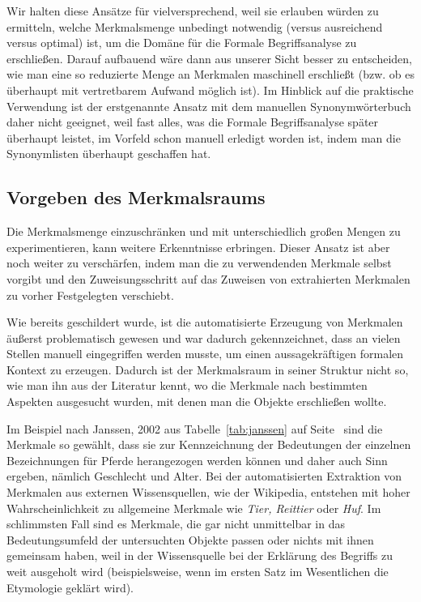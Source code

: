\documentclass[pagesize,paper=A4,DIV=calc,fontsize=12pt,draft=false]{scrreprt}
\begin{document}
Wir halten diese Ansätze für vielversprechend, weil sie erlauben würden zu ermitteln, welche Merkmalsmenge unbedingt notwendig (versus ausreichend versus optimal) ist, um die Domäne für die Formale Begriffsanalyse zu erschließen.
Darauf aufbauend wäre dann aus unserer Sicht besser zu entscheiden, wie man eine so reduzierte Menge an Merkmalen maschinell erschließt (bzw. ob es überhaupt mit vertretbarem Aufwand möglich ist).
Im Hinblick auf die praktische Verwendung ist der erstgenannte Ansatz mit dem manuellen Synonymwörterbuch daher nicht geeignet, weil fast alles, was die Formale Begriffsanalyse später überhaupt leistet, im Vorfeld schon manuell erledigt worden ist, indem man die Synonymlisten überhaupt geschaffen hat.

\subsection{Vorgeben des Merkmalsraums}

Die Merkmalsmenge einzuschränken und mit unterschiedlich großen Mengen zu experimentieren, kann weitere Erkenntnisse erbringen.
Dieser Ansatz ist aber noch weiter zu verschärfen, indem man die zu verwendenden Merkmale selbst vorgibt und den Zuweisungsschritt auf das Zuweisen von extrahierten Merkmalen zu vorher Festgelegten verschiebt.

Wie bereits geschildert wurde, ist die automatisierte Erzeugung von Merkmalen äußerst problematisch gewesen und war dadurch gekennzeichnet, dass an vielen Stellen manuell eingegriffen werden musste, um einen aussagekräftigen formalen Kontext zu erzeugen. 
Dadurch ist der Merkmalsraum in seiner Struktur nicht so, wie man ihn aus der Literatur kennt, wo die Merkmale nach bestimmten Aspekten ausgesucht wurden, mit denen man die Objekte erschließen wollte.

Im Beispiel nach Janssen, 2002 aus Tabelle~\ref{tab:janssen} auf Seite~\pageref{tab:janssen} sind die Merkmale so gewählt, dass sie zur Kennzeichnung der Bedeutungen der einzelnen Bezeichnungen für Pferde herangezogen werden können und daher auch Sinn ergeben, nämlich Geschlecht und Alter.
Bei der automatisierten Extraktion von Merkmalen aus externen Wissensquellen, wie der Wikipedia, entstehen mit hoher Wahrscheinlichkeit zu allgemeine Merkmale wie \emph{Tier, Reittier} oder \emph{Huf}.
Im schlimmsten Fall sind es Merkmale, die gar nicht unmittelbar in das Bedeutungsumfeld der untersuchten Objekte passen oder nichts mit ihnen gemeinsam haben, weil in der Wissensquelle bei der Erklärung des Begriffs zu weit ausgeholt wird (beispielsweise, wenn im ersten Satz im Wesentlichen die Etymologie geklärt wird).
\end{document}
